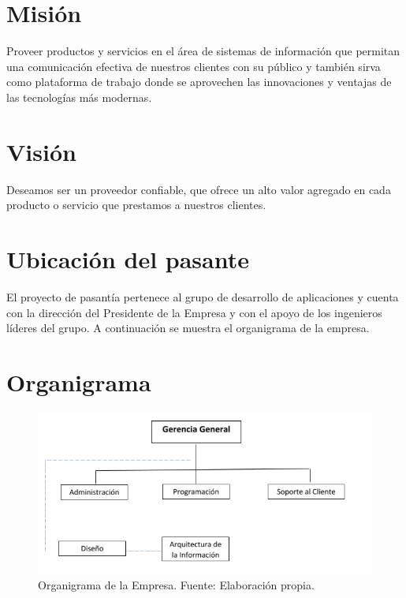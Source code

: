 \section{Misión}
Proveer productos y servicios en el área de sistemas de información que permitan una comunicación efectiva de nuestros clientes con su público y también sirva como plataforma de trabajo donde se aprovechen las innovaciones y ventajas de las tecnologías más modernas.

\section{Visión}
Deseamos ser un proveedor confiable, que ofrece un alto valor agregado en cada producto o servicio que prestamos a nuestros clientes.

\section{Ubicación del pasante}
El proyecto de pasantía pertenece al grupo de desarrollo de aplicaciones y cuenta con la dirección del Presidente de la Empresa y con el apoyo de los ingenieros líderes del grupo. A continuación se muestra el organigrama de la empresa.


\pagebreak
\section{Organigrama}
\begin{figure}[hbt]
\begin{center}
\includegraphics[scale=0.8]{organigrama}
\caption{Organigrama de la Empresa. Fuente: Elaboración propia.}
\label{fig:figura1}
\end{center}
\end{figure}
